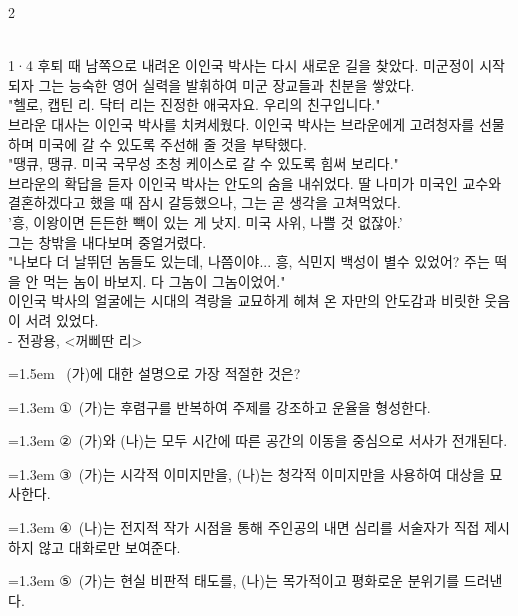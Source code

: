 \documentclass[10pt, a4paper]{article}
\begin{document}
\begin{multicols}{2}
\begin{passagebox}
\\[0.5em]
1·4 후퇴 때 남쪽으로 내려온 이인국 박사는 다시 새로운 길을 찾았다. 미군정이 시작되자 그는 능숙한 영어 실력을 발휘하여 미군 장교들과 친분을 쌓았다. \\
"헬로, 캡틴 리. 닥터 리는 진정한 애국자요. 우리의 친구입니다." \\
브라운 대사는 이인국 박사를 치켜세웠다. 이인국 박사는 브라운에게 고려청자를 선물하며 미국에 갈 수 있도록 주선해 줄 것을 부탁했다. \\
"땡큐, 땡큐. 미국 국무성 초청 케이스로 갈 수 있도록 힘써 보리다." \\
브라운의 확답을 듣자 이인국 박사는 안도의 숨을 내쉬었다. 딸 나미가 미국인 교수와 결혼하겠다고 했을 때 잠시 갈등했으나, 그는 곧 생각을 고쳐먹었다. \\
'흥, 이왕이면 든든한 빽이 있는 게 낫지. 미국 사위, 나쁠 것 없잖아.' \\
그는 창밖을 내다보며 중얼거렸다. \\
"나보다 더 날뛰던 놈들도 있는데, 나쯤이야... 흥, 식민지 백성이 별수 있었어? 주는 떡을 안 먹는 놈이 바보지. 다 그놈이 그놈이었어." \\
이인국 박사의 얼굴에는 시대의 격랑을 교묘하게 헤쳐 온 자만의 안도감과 비릿한 웃음이 서려 있었다.
\\[0.5em]
- 전광용, <꺼삐딴 리>
\end{passagebox}
\vspace{1mm}

\noindent\begin{minipage}{\columnwidth}
\vspace{2mm}
{\hangindent=1.5em  ~(가)에 대한 설명으로 가장 적절한 것은?\par}

\vspace{0.5mm}
{\hangindent=1.3em  \noindent\hspace{0.3em}①~(가)는 후렴구를 반복하여 주제를 강조하고 운율을 형성한다.\par}
{\hangindent=1.3em  \noindent\hspace{0.3em}②~(가)와 (나)는 모두 시간에 따른 공간의 이동을 중심으로 서사가 전개된다.\par}
{\hangindent=1.3em  \noindent\hspace{0.3em}③~(가)는 시각적 이미지만을, (나)는 청각적 이미지만을 사용하여 대상을 묘사한다.\par}
{\hangindent=1.3em  \noindent\hspace{0.3em}④~(나)는 전지적 작가 시점을 통해 주인공의 내면 심리를 서술자가 직접 제시하지 않고 대화로만 보여준다.\par}
{\hangindent=1.3em  \noindent\hspace{0.3em}⑤~(가)는 현실 비판적 태도를, (나)는 목가적이고 평화로운 분위기를 드러낸다.\par}
\vspace{4mm}
\end{minipage}
\par


\end{multicols}
\end{document}
